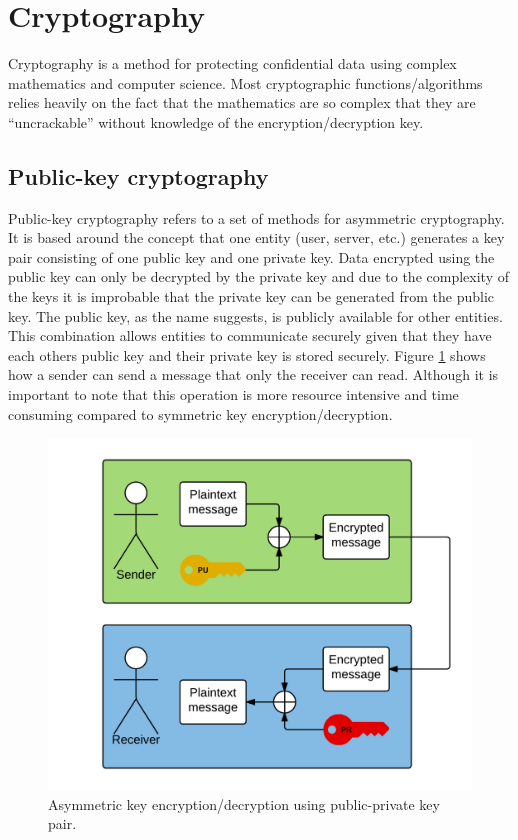 \section{Cryptography}
Cryptography is a method for protecting confidential data using complex mathematics and computer science. Most cryptographic functions/algorithms relies heavily on the fact that the mathematics are so complex that they are ``uncrackable'' without knowledge of the encryption/decryption key.

\subsection{Public-key cryptography}
\label{sec:publicKeyCrypto}
Public-key cryptography refers to a set of methods for asymmetric cryptography. It is based around the concept that one entity (user, server, etc.) generates a key pair consisting of one public key and one private key. Data encrypted using the public key can only be decrypted by the private key and due to the complexity of the keys it is improbable that the private key can be generated from the public key. The public key, as the name suggests, is publicly available for other entities. This combination allows entities to communicate securely given that they have each others public key and their private key is stored securely. Figure \ref{fig:encrypt_basic} shows how a sender can send a message that only the receiver can read. Although it is important to note that this operation is more resource intensive and time consuming compared to symmetric key encryption/decryption.

\begin{figure}[h!]
  \captionsetup{justification=centering,margin=1.5cm}
  \caption{Asymmetric key encryption/decryption using public-private key pair.}
  \label{fig:encrypt_basic}
  \centering
    \includegraphics[width=1\textwidth]{images/encrypt_basic.png}
\end{figure}


